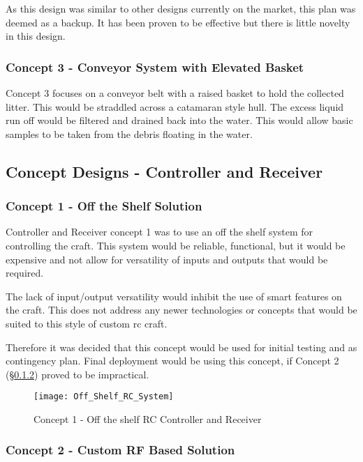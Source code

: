 \documentclass [11pt]{article}
\begin{document}
As this design was similar to other designs currently on the market, this plan was deemed as a backup. It has been proven to be effective but there is little novelty in this design. 

\subsubsection{Concept 3 - Conveyor System with Elevated Basket}
Concept 3 focuses on a conveyor belt with a raised basket to hold the collected litter. This would be straddled across a catamaran style hull. The excess liquid run off would be filtered and drained back into the water. This would allow basic samples to be taken from the debris  floating in the water. 

\subsection{Concept Designs - Controller and Receiver}
\subsubsection{Concept 1 - Off the Shelf Solution}
Controller and Receiver concept 1 was to use an off the shelf system for controlling the craft. This system would be reliable, functional, but it would be expensive and not allow for versatility of inputs and outputs that would be required. 

The lack of input/output versatility would inhibit the use of smart features on the craft. This does not address any newer technologies or concepts that would be suited to this style of custom \gls{rc} craft. 

Therefore it was decided that this concept would be used for initial testing and as contingency plan. Final deployment would be using this concept, if Concept 2 (§\ref{sec:concept_2}) proved to be impractical. 

\begin{figure}[H]
\centerline{\texttt{[image: Off\_Shelf\_RC\_System]}}
\caption{Concept 1 - Off the shelf RC Controller and Receiver}
\label{fig:Off_shelf_RC_System}
\end{figure} 


\subsubsection{Concept 2 - Custom RF Based Solution} \label{sec:concept_2}
\end{document}
